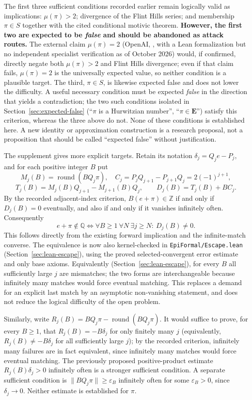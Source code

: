 \documentclass[11pt]{amsart}
\theoremstyle{definition}
\theoremstyle{remark}
\numberwithin{equation}{section}
\newcommand{\Q}{\mathbb{Q}}
\newcommand{\Z}{\mathbb{Z}}
\newcommand{\irr}{\mu}
\begin{document}
The first three sufficient conditions recorded earlier remain logically valid as implications: $\irr(\pi)>2$; divergence of the Flint Hills series; and membership $\pi\in S$ together with the cited conditional motivic theorem. \textbf{However, the first two are expected to be \emph{false} and should be abandoned as attack routes.} The external claim $\irr(\pi)=2$ (OpenAI, \cite{OpenAI2026}, with a Lean formalization but no independent specialist verification as of October 2026) would, if confirmed, directly negate both $\irr(\pi)>2$ and Flint Hills divergence; even if that claim fails, $\irr(\pi)=2$ is the universally expected value, so neither condition is a plausible target. The third, $\pi\in S$, is likewise expected false and does not lower the difficulty. A useful necessary condition must be expected \emph{false} in the direction that yields a contradiction; the two such conditions isolated in Section~\ref{sec:expected-false} (``$\pi$ is a Hurwitzian number'', ``$\pi\in\mathbf{E}$'') satisfy this criterion, whereas the three above do not. None of these conditions is established here. A new identity or approximation construction is a research proposal, not a proposition that should be called ``expected false'' without justification.

The supplement gives more explicit targets. Retain its notation $\delta_j=Q_je-P_j$, and for each positive integer $B$ put
\[
M_j(B)=\operatorname{round}(BQ_j\pi),\quad
C_j=P_jQ_{j+1}-P_{j+1}Q_j=2(-1)^{j+1},
\]
\[
T_j(B)=M_j(B)Q_{j+1}-M_{j+1}(B)Q_j,\qquad
D_j(B)=T_j(B)+BC_j.
\]
By the recorded adjacent-index criterion, $B(e+\pi)\in\Z$ if and only if $D_j(B)=0$ eventually, and also if and only if it vanishes infinitely often. Consequently
\[
e+\pi\notin\Q
\iff \forall B\ge1\ \forall N\ \exists j\ge N:\ D_j(B)\ne0.
\]
This follows directly from the existing forward implication and the infinite-match converse. The equivalence is now also kernel-checked in \texttt{EpiFormal/Escape.lean} (Section~\ref{sec:lean-escape}), using the proved selected-convergent error estimate and only base axioms. Equivalently (Section~\ref{sec:lean-escape}), for every $B$ all sufficiently large $j$ are mismatches; the two forms are interchangeable because infinitely many matches would force eventual matching. This replaces a demand for an explicit last match by an asymptotic non-vanishing statement, and does not reduce the logical difficulty of the open problem.

Similarly, write $R_j(B)=BQ_j\pi-\operatorname{round}(BQ_j\pi)$. It would suffice to prove, for every $B\ge1$, that $R_j(B)=-B\delta_j$ for only finitely many $j$ (equivalently, $R_j(B)\ne-B\delta_j$ for all sufficiently large $j$); by the recorded criterion, infinitely many failures are in fact equivalent, since infinitely many matches would force eventual matching. The previously proposed positive-product estimate $R_j(B)\delta_j>0$ infinitely often is a stronger sufficient condition. A separate sufficient condition is $\|BQ_j\pi\|\ge\varepsilon_B$ infinitely often for some $\varepsilon_B>0$, since $\delta_j\to0$. Neither estimate is established for $\pi$.
\end{document}
